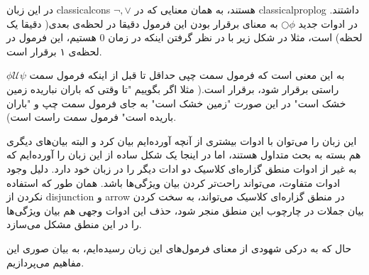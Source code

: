 در این زبان \glspl*{classicalcon}
$\neg, \lor$
هستند، به همان معنایی که در \gls*{classicalproplog} داشتند.  
در ادوات جدید 
$\bigcirc \phi$
به معنای برقرار بودن این فرمول دقیقا در لحظه‌ی بعدی( دقیقا یک لحظه) است، مثلا در شکل زیر با در نظر گرفتن اینکه در زمان 0 هستیم، این فرمول در لحظه‌ی ۱ برقرار است.
	\begin{center}
\end{center}
$\phi \mathcal{U}\psi$
به این معنی است که فرمول سمت چپی حداقل تا قبل از اینکه فرمول سمت راستی برقرار شود، برقرار است.( مثلا اگر بگوییم "تا وقتی که باران نباریده زمین خشک است" در این صورت "زمین خشک است" به جای فرمول سمت چپ و "باران باریده است" فرمول سمت راست است).
\begin{center}
\end{center}

این زبان را می‌توان با ادوات بیشتری از آنچه آورده‌ایم بیان کرد و البته بیان‌های دیگری هم بسته به بحث متداول هستند، اما در اینجا یک شکل ساده از این زبان را آورده‌ایم که به غیر از ادوات منطق گزاره‌ای کلاسیک دو ادات دیگر را در زبان خود دارد. دلیل وجود ادوات متفاوت، می‌تواند راحت‌تر کردن بیان ویژگی‌ها باشد. همان طور که استفاده نکردن از \gls*{disjunction} و \gls*{arrow} در منطق گزاره‌ای کلاسیک می‌تواند، به سخت کردن بیان جملات در چارچوب این منطق منجر شود، حذف این ادوات وجهی هم بیان ویژگی‌ها را در این منطق مشکل می‌سازد. 

حال که به درکی شهودی از معنای فرمول‌های این زبان رسیده‌ایم، به بیان صوری این مفاهیم می‌پردازیم.

